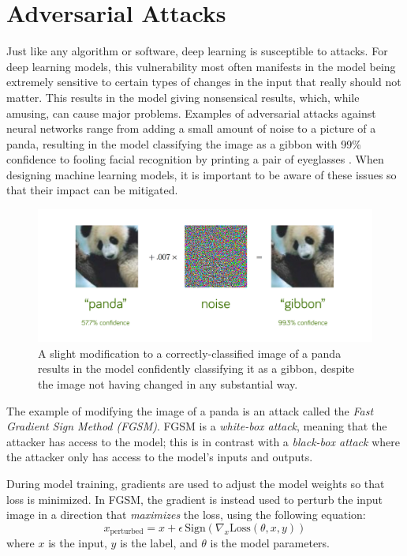 \section*{Adversarial Attacks}

Just like any algorithm or software, deep learning is susceptible to attacks.
For deep learning models, this vulnerability most often manifests in the model being extremely sensitive to certain types of changes in the input that really should not matter.
This results in the model giving nonsensical results, which, while amusing, can cause major problems.
Examples of adversarial attacks against neural networks range from adding a small amount of noise to a picture of a panda, resulting in the model classifying the image as a gibbon with 99\% confidence \cite{goodfellow2015advesarial} to fooling facial recognition by printing a pair of eyeglasses \cite{goodfellow2017physical}.
When designing machine learning models, it is important to be aware of these issues so that their impact can be mitigated.

\begin{figure}[H] %
\centering

 	\includegraphics[width=\textwidth]{figures/panda.png}
    \caption{A slight modification to a correctly-classified image of a panda results in the model confidently classifying it as a gibbon, despite the image not having changed in any substantial way.}
\end{figure}

The example of modifying the image of a panda is an attack called the \emph{Fast Gradient Sign Method (FGSM)}.
FGSM is a \emph{white-box attack}, meaning that the attacker has access to the model; this is in contrast with a \emph{black-box attack} where the attacker only has access to the model's inputs and outputs.

During model training, gradients are used to adjust the model weights so that loss is minimized.
In FGSM, the gradient is instead used to perturb the input image in a direction that \emph{maximizes} the loss, using the following equation:
\begin{equation*}
x_\text{perturbed} = x + \epsilon\, \mathrm{Sign}(\nabla_x \mathrm{Loss}(\theta, x, y))
\end{equation*}
where $x$ is the input, $y$ is the label, and $\theta$ is the model parameters.

